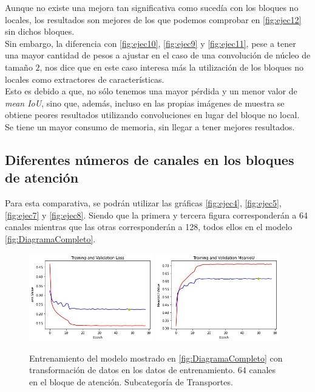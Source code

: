 \newpage
Aunque no existe una mejora tan significativa como sucedía con los bloques no locales, los resultados son mejores de los que podemos comprobar en \autoref{fig:ejec12} sin dichos bloques.\\

\newpage
Sin embargo, la diferencia con \autoref{fig:ejec10}, \autoref{fig:ejec9} y \autoref{fig:ejec11}, pese a tener una mayor cantidad de pesos a ajustar en el caso de una convolución de núcleo de tamaño $2$, nos dice que en este caso interesa más la utilización de los bloques no locales como extractores de características.\\

Esto es debido a que, no sólo tenemos una mayor pérdida y un menor valor de \emph{mean IoU}, sino que, además, incluso en las propias imágenes de muestra se obtiene peores resultados utilizando convoluciones en lugar del bloque no local. Se tiene un mayor consumo de memoria, sin llegar a tener mejores resultados.\\

\newpage
\subsection{Diferentes números de canales en los bloques de atención}
Para esta comparativa, se podrán utilizar las gráficas \autoref{fig:ejec4}, \autoref{fig:ejec5}, \autoref{fig:ejec7} y \autoref{fig:ejec8}. Siendo que la primera y tercera figura corresponderán a 64 canales mientras que las otras corresponderán a 128, todos ellos en el modelo \autoref{fig:DiagramaCompleto}.\\

\begin{figure}[h!]
  \centering
  \includegraphics[width=0.48\textwidth]{../../modelos-entrenados/unet-nonlocal/ejecucion4/loss}
  \includegraphics[width=0.48\textwidth]{../../modelos-entrenados/unet-nonlocal/ejecucion4/iou}
  \caption{Entrenamiento del modelo mostrado en \autoref{fig:DiagramaCompleto} con transformación de datos en los datos de entrenamiento. $64$ canales en el bloque de atención. Subcategoría de Transportes.}
  \label{fig:ejec4}
\end{figure}

